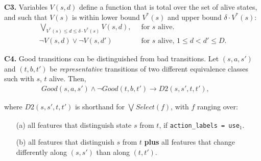 \documentclass[a4paper]{article}
\newcommand{\smallpar}[1]{{\vspace{10pt}\noindent \bf #1.}}
\newcommand{\badtx}{\ensuremath{\mathrm{BAD}}}
\begin{document}



\smallpar{C3}
Variables $V(s, d)$ define a function that is total over the set of alive states,
and such that $V(s)$ is within lower bound $V^*(s)$ and upper bound $\delta \cdot V^*(s)$:
\begin{align*}
 \bigvee_{V^*(s) \leq d \leq \delta \cdot V^*(s)} V(s,d),&\;\; \text{for $s$ alive.} \\
 \neg V(s, d) \lor \neg V(s, d')&\;\; \text{for $s$ alive, $1 \leq d < d' \leq D$.}
\end{align*}


\smallpar{C4}
Good transitions can be distinguished from bad transitions.
Let $(s, a, s')$ and $(t, b, t')$ be \emph{representative} transitions
of two different equivalence classes such with $s$, $t$ alive. Then,
\begin{align*}
 Good(s, a, s') \land \neg Good(t, b, t') \rightarrow
 D2(s, s', t, t'),&\;\; \text{  }
\end{align*}

\noindent where $D2(s, s', t, t')$ is shorthand for $\bigvee_{} Select(f)$, with $f$ ranging over:
\begin{itemize}
 \item[(a)] all features that distinguish state $s$ from $t$, if \texttt{action\_labels = use$_1$}.
 \item[(b)] all features that distinguish $s$ from $t$ \textbf{plus} all features that
 change differently along $(s, s')$ than along $(t, t')$.
\end{itemize}
\end{document}

